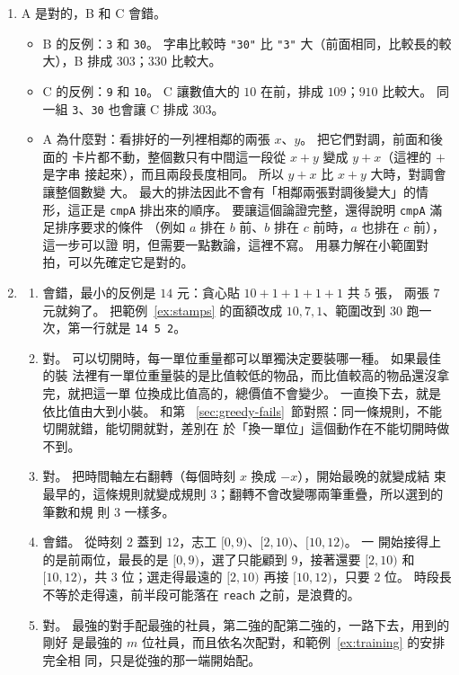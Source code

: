 \begin{enumerate}
\item A 是對的，B 和 C 會錯。
\begin{itemize}
\item B 的反例：\texttt{3} 和 \texttt{30}。 字串比較時 \texttt{"30"} 比
\texttt{"3"} 大（前面相同，比較長的較大），B 排成 $303$；$330$ 比較大。
\item C 的反例：\texttt{9} 和 \texttt{10}。 C 讓數值大的 $10$ 在前，排成
$109$；$910$ 比較大。 同一組 \texttt{3}、\texttt{30} 也會讓 C 排成 $303$。
\item A 為什麼對：看排好的一列裡相鄰的兩張 $x$、$y$。 把它們對調，前面和後面的
卡片都不動，整個數只有中間這一段從 $x + y$ 變成 $y + x$（這裡的 $+$ 是字串
接起來），而且兩段長度相同。 所以 $y + x$ 比 $x + y$ 大時，對調會讓整個數變
大。 最大的排法因此不會有「相鄰兩張對調後變大」的情形，這正是 \texttt{cmpA}
排出來的順序。 要讓這個論證完整，還得說明 \texttt{cmpA} 滿足排序要求的條件
（例如 $a$ 排在 $b$ 前、$b$ 排在 $c$ 前時，$a$ 也排在 $c$ 前），這一步可以證
明，但需要一點數論，這裡不寫。 用暴力解在小範圍對拍，可以先確定它是對的。
\end{itemize}

\item
\begin{enumerate}
\item 會錯，最小的反例是 $14$ 元：貪心貼 $10 + 1 + 1 + 1 + 1$ 共 $5$ 張，
兩張 $7$ 元就夠了。 把範例~\ref{ex:stamps} 的面額改成 $10, 7, 1$、範圍改到
$30$ 跑一次，第一行就是 \texttt{14 5 2}。
\item 對。 可以切開時，每一單位重量都可以單獨決定要裝哪一種。 如果最佳的裝
法裡有一單位重量裝的是比值較低的物品，而比值較高的物品還沒拿完，就把這一單
位換成比值高的，總價值不會變少。 一直換下去，就是依比值由大到小裝。 和第
~\ref{sec:greedy-fails}~節對照：同一條規則，不能切開就錯，能切開就對，差別在
於「換一單位」這個動作在不能切開時做不到。
\item 對。 把時間軸左右翻轉（每個時刻 $x$ 換成 $-x$），開始最晚的就變成結
束最早的，這條規則就變成規則 3；翻轉不會改變哪兩筆重疊，所以選到的筆數和規
則 3 一樣多。
\item 會錯。 從時刻 $2$ 蓋到 $12$，志工 $[0, 9)$、$[2, 10)$、$[10, 12)$。 一
開始接得上的是前兩位，最長的是 $[0, 9)$，選了只能顧到 $9$，接著還要
$[2, 10)$ 和 $[10, 12)$，共 $3$ 位；選走得最遠的 $[2, 10)$ 再接
$[10, 12)$，只要 $2$ 位。 時段長不等於走得遠，前半段可能落在 \texttt{reach}
之前，是浪費的。
\item 對。 最強的對手配最強的社員，第二強的配第二強的，一路下去，用到的剛好
是最強的 $m$ 位社員，而且依名次配對，和範例~\ref{ex:training} 的安排完全相
同，只是從強的那一端開始配。
\end{enumerate}


\end{enumerate}
